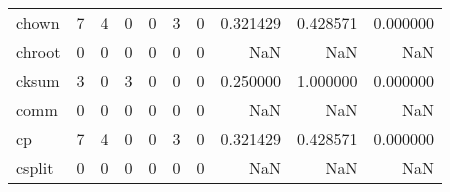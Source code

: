 \begin{tabular}{lrrrrrrrrr}
chown     &                                                  7 &                                                  4 &                                                  0 &                                                  0 &                                                  3 &                                                  0 &                                           0.321429 &                               0.428571 &                             0.000000 \\
chroot    &                                                  0 &                                                  0 &                                                  0 &                                                  0 &                                                  0 &                                                  0 &                                                NaN &                                    NaN &                                  NaN \\
cksum     &                                                  3 &                                                  0 &                                                  3 &                                                  0 &                                                  0 &                                                  0 &                                           0.250000 &                               1.000000 &                             0.000000 \\
comm      &                                                  0 &                                                  0 &                                                  0 &                                                  0 &                                                  0 &                                                  0 &                                                NaN &                                    NaN &                                  NaN \\
cp        &                                                  7 &                                                  4 &                                                  0 &                                                  0 &                                                  3 &                                                  0 &                                           0.321429 &                               0.428571 &                             0.000000 \\
csplit    &                                                  0 &                                                  0 &                                                  0 &                                                  0 &                                                  0 &                                                  0 &                                                NaN &                                    NaN &                                  NaN \\

\end{tabular}
